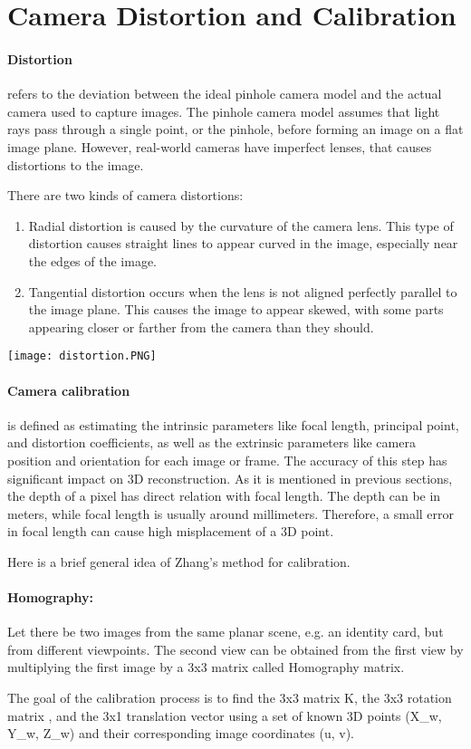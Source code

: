 \documentclass[11pt]{article}
\begin{document}
    \section{Camera Distortion and Calibration}

    \paragraph{Distortion} refers to the deviation between the ideal pinhole camera model and the actual camera
    used to capture images. The pinhole camera model assumes that light rays pass through a single point, or
    the pinhole, before forming an image on a flat image plane. However, real-world cameras have imperfect
    lenses, that causes distortions to the image.

    There are two kinds of camera distortions:

    \begin{enumerate}
        \item Radial distortion is caused by the curvature of the camera lens. This type of distortion
        causes straight lines to appear curved in the image, especially near the edges of the image.
        \item Tangential distortion occurs when the lens is not aligned perfectly parallel to the image plane.
        This causes the image to appear skewed, with some parts appearing closer or farther from the camera
        than they should.
    \end{enumerate}
    {\texttt{[image: distortion.PNG]}}

    \paragraph{Camera calibration} is defined as estimating the intrinsic parameters like focal length,
    principal point, and distortion coefficients, as well as the extrinsic parameters like camera position
    and orientation for each image or frame. The accuracy of this step has significant impact on 3D reconstruction.
    As it is mentioned in previous sections, the depth of a pixel has direct relation with focal length. The depth
    can be in meters, while focal length is usually around millimeters. Therefore, a small error in focal length
    can cause high misplacement of a 3D point.

    Here is a brief general idea of Zhang's method for calibration.
    \paragraph{Homography:} Let there be two images from the same planar scene, e.g. an identity card, but from
    different viewpoints. The second view can be obtained from the first view by multiplying the first image by
    a 3x3 matrix called Homography matrix.


    The goal of the calibration process is to find the 3x3 matrix K, the 3x3 rotation matrix , and
    the 3x1 translation vector  using a set of known 3D points (X_w, Y_w, Z_w) and their corresponding
    image coordinates (u, v).

\end{document}
